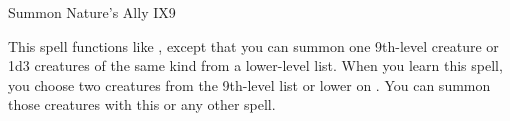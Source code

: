\begin{spellsection}{Summon Nature's Ally IX}{9}
\begin{spellheader}
\end{spellheader}
\begin{spellcontent}
    \spelleffect This spell functions like , except that you can summon one 9th-level creature or 1d3 creatures of the same kind from a lower-level list. When you learn this spell, you choose two creatures from the 9th-level list or lower on . You can summon those creatures with this or any other  spell.

    \spelldur \durshort \dismissable
\end{spellcontent}
\begin{spellfooter}
\end{spellfooter}
\end{spellsection}
